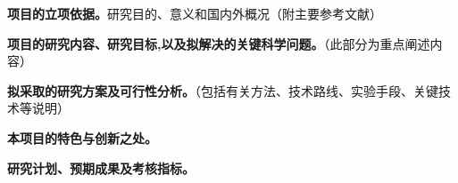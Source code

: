 \begin{HuazhongOutline}
  \item \textbf{项目的立项依据。}研究目的、意义和国内外概况（附主要参考文献）
  \item \textbf{项目的研究内容、研究目标,以及拟解决的关键科学问题。}（此部分为重点阐述内容）
  \item \textbf{拟采取的研究方案及可行性分析。}（包括有关方法、技术路线、实验手段、关键技术等说明）
  \item \textbf{本项目的特色与创新之处。}
  \item \textbf{研究计划、预期成果及考核指标。}
\end{HuazhongOutline}
